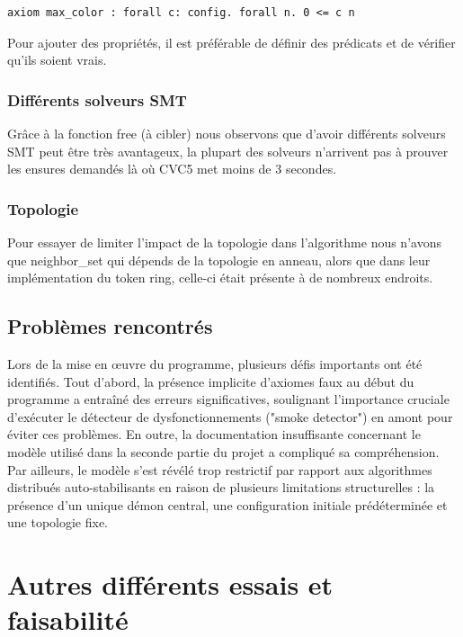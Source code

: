 \documentclass[11pt]{article}
\begin{document}
\lstset{language=why3,label= ,caption= ,captionpos=b,numbers=none}
\begin{lstlisting}
axiom max_color : forall c: config. forall n. 0 <= c n
\end{lstlisting}


Pour ajouter des propriétés, il est préférable de définir des prédicats et de vérifier qu'ils soient vrais. 

\subsubsection{Différents solveurs SMT}
\label{sec:orge14bf4d}

Grâce à la fonction free (à cibler) nous observons que d'avoir différents solveurs SMT 
peut être très avantageux, la plupart des solveurs n'arrivent pas à prouver
les ensures demandés là où CVC5 met moins de 3 secondes.

\subsubsection{Topologie}
\label{sec:org324f051}

Pour essayer de limiter l'impact de la topologie dans l'algorithme nous n'avons que 
neighbor\_set qui dépends de la topologie en anneau,
alors que dans leur implémentation du token ring, celle-ci était présente à de nombreux endroits.

\subsection{Problèmes rencontrés}
\label{sec:org8089f71}

Lors de la mise en œuvre du programme, plusieurs défis importants ont été identifiés. 
Tout d'abord, la présence implicite d'axiomes faux au début du programme a entraîné des erreurs significatives, 
soulignant l'importance cruciale d'exécuter le détecteur de dysfonctionnements ("smoke detector") en amont pour éviter ces problèmes. 
En outre, la documentation insuffisante concernant le modèle utilisé dans la seconde partie du projet a compliqué sa compréhension. 
Par ailleurs, le modèle s'est révélé trop restrictif par rapport aux algorithmes distribués auto-stabilisants en raison de plusieurs limitations structurelles : 
la présence d'un unique démon central, une configuration initiale prédéterminée et une topologie fixe. 

\section{Autres différents essais et faisabilité}
\label{sec:org55a5f85}
\end{document}

